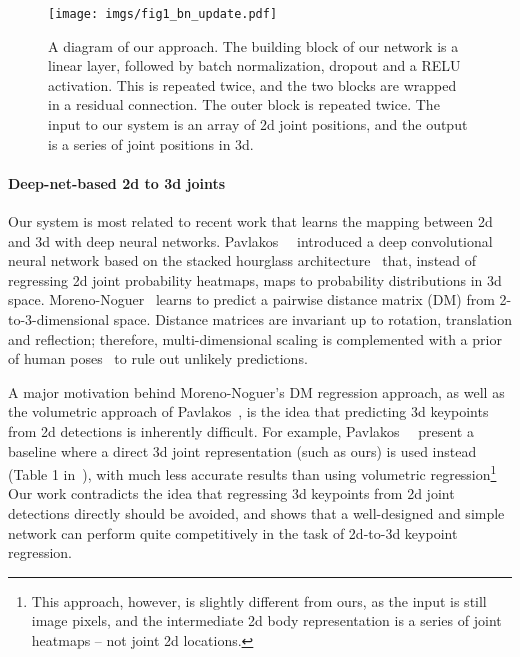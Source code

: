 \documentclass[10pt,twocolumn,letterpaper]{article}
\begin{document}
\begin{figure*}
  \texttt{[image: imgs/fig1\_bn\_update.pdf]}
  \vspace{-8mm}
  \caption{A diagram of our approach. The building block of our network is a linear layer, followed by batch normalization, dropout and a RELU activation. This is repeated twice, and the two blocks are wrapped in a residual connection. The outer block is repeated twice. The input to our system is an array of 2d joint positions, and the output is a series of joint positions in 3d.}
  \label{fig:diag}
\end{figure*}

\paragraph{Deep-net-based 2d to 3d joints}
Our system is most related to recent work that learns the mapping between 2d and 3d with deep neural networks.
Pavlakos~\etal~\cite{volumetric} introduced a deep convolutional neural network based on the stacked hourglass architecture~\cite{stacked-hourglass} that, instead of regressing 2d joint probability heatmaps, maps to probability distributions in 3d space.
Moreno-Noguer~\cite{distance-matrix} learns to predict a pairwise distance matrix (DM) from 2-to-3-dimensional space. Distance matrices are invariant up to rotation, translation and reflection; therefore, multi-dimensional scaling is complemented with a prior of human poses~\cite{akhter-and-black} to rule out unlikely predictions.

A major motivation behind 
Moreno-Noguer's
DM regression approach, as well as the volumetric approach of Pavlakos~\etal, is the idea that predicting 3d keypoints from 2d detections is inherently difficult. For example, Pavlakos~\etal~\cite{volumetric} present a baseline where a direct 3d joint representation (such as ours) is used instead (Table 1 in~\cite{volumetric}), with much less accurate results than using volumetric regression\footnote{This approach, however, is slightly different from ours, as the input is still image pixels, and the intermediate 2d body representation is a series of joint heatmaps -- not joint 2d locations.}
Our work contradicts the idea that regressing 3d keypoints from 2d joint detections directly should be avoided, and shows that a well-designed and simple network can perform quite competitively in the task of 2d-to-3d keypoint regression.
\end{document}
